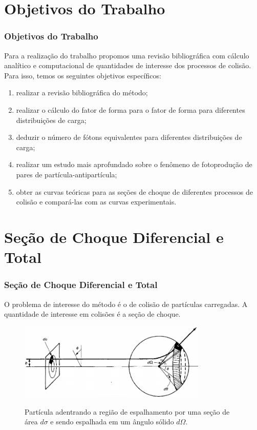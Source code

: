 \documentclass[xcolor=dvipsnames]{beamer}
\begin{document}
\section{Objetivos do Trabalho}
\begin{frame}
	\frametitle{Objetivos do Trabalho}

	Para a realização do trabalho propomos uma revisão bibliográfica com cálculo
	analítico e computacional de quantidades de interesse dos processos de
	colisão. Para isso, temos os seguintes objetivos específicos:

	\begin{enumerate}
		\item realizar a revisão bibliográfica do método;
		\item realizar o cálculo do fator de forma para o fator de forma
			para diferentes distribuições de carga;
		\item deduzir o número de fótons equivalentes para diferentes
			distribuições de carga;
		\item realizar um estudo mais aprofundado sobre o fenômeno de
			fotoprodução de pares de partícula-antipartícula;
		\item obter as curvas teóricas para as seções de choque de diferentes
			processos de colisão e compará-las com as curvas experimentais.
	\end{enumerate}

\end{frame}

\section{Seção de Choque Diferencial e Total}
\begin{frame}
	\frametitle{Seção de Choque Diferencial e Total}

	O problema de interesse do método é o de colisão de partículas carregadas.
	A quantidade de interesse em colisões é a seção de choque.

	\begin{figure}[h]
		\centering
		\includegraphics[width=0.8\textwidth]{./figs/cross_section.jpeg}
		\label{fig_cross_section}
		\caption{Partícula adentrando a região de espalhamento por uma
		seção de área $d\sigma$ e  sendo espalhada em um ângulo sólido
		$d\Omega$.}
	\end{figure}
\end{frame}
\end{document}
